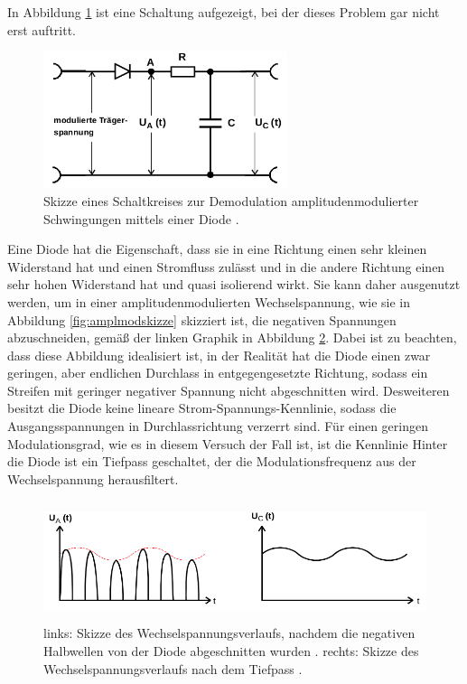 In Abbildung \ref{fig:ampldemodschaltung2} ist eine Schaltung aufgezeigt, bei der dieses Problem gar nicht erst auftritt.

\begin{figure}
  \centering
  \includegraphics[height=4cm]{JasperErsterSchultag/ampldemodschaltung2.png}
  \caption{Skizze eines Schaltkreises zur Demodulation amplitudenmodulierter Schwingungen mittels einer Diode \cite{anleitung}.}
  \label{fig:ampldemodschaltung2}
\end{figure}

Eine Diode hat die Eigenschaft, dass sie in eine Richtung einen sehr kleinen Widerstand hat und einen Stromfluss zulässt und in die
andere Richtung einen sehr hohen Widerstand hat und quasi isolierend wirkt. Sie kann daher ausgenutzt werden, um in einer amplitudenmodulierten
Wechselspannung, wie sie in Abbildung \ref{fig:amplmodskizze} skizziert ist, die negativen Spannungen abzuschneiden, gemäß der linken Graphik in
Abbildung \ref{fig:diodetiefpass}. Dabei ist zu beachten, dass diese Abbildung idealisiert ist, in der Realität hat die Diode einen zwar geringen, aber
endlichen Durchlass in entgegengesetzte Richtung, sodass ein Streifen mit geringer negativer Spannung nicht abgeschnitten wird.
Desweiteren besitzt die Diode keine lineare Strom-Spannungs-Kennlinie, sodass die Ausgangsspannungen in Durchlassrichtung verzerrt sind.
Für einen geringen Modulationsgrad, wie es in diesem Versuch der Fall ist, ist die Kennlinie
Hinter die Diode ist ein Tiefpass geschaltet, der die Modulationsfrequenz aus der Wechselspannung herausfiltert.

\begin{figure}
  \centering
  \includegraphics[height=3.5cm]{JasperErsterSchultag/diodetiefpass.png}
  \caption{links: Skizze des Wechselspannungsverlaufs, nachdem die negativen Halbwellen von der Diode abgeschnitten wurden \cite{anleitung}.
  rechts: Skizze des Wechselspannungsverlaufs nach dem Tiefpass \cite{anleitung}.}
  \label{fig:diodetiefpass}
\end{figure}

